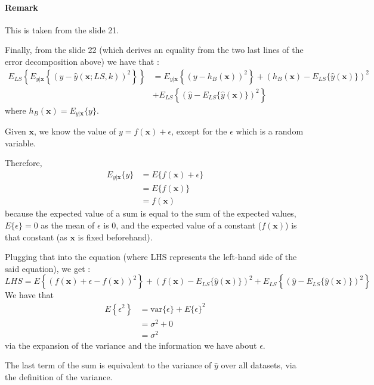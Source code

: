 \paragraph{Remark} This is taken from the slide 21.\par
Finally, from the slide 22 (which derives an equality from the two last lines of the error decomposition above) we have that :
\begin{align*}
    E_{L S}\left\{E_{y | \mathbf{x}}\left\{(y-\hat{y}(\mathbf{x} ; L S, k))^{2}\right\}\right\} &= E_{y | \mathbf{x}}\left\{\left(y-h_{B}(\mathbf{x})\right)^{2}\right\} + \left(h_{B}(\mathbf{x})-E_{L S}\{\hat{y}(\mathbf{x})\}\right)^{2}\\
    &+ E_{L S}\left\{\left(\hat{y}-E_{L S}\{\hat{y}(\mathbf{x})\}\right)^{2}\right\}    
\end{align*}
where $h_{B}(\mathbf{x})=E_{y | \mathbf{x}}\{y\}$.\par
Given $\mathbf{x}$, we know the value of $y = f(\mathbf{x}) + \epsilon$, except for the $\epsilon$ which is a random variable.\par
Therefore,
\begin{align*}
    E_{y | \mathbf{x}}\{y\} &= E\{f(\mathbf{x}) + \epsilon\}\\
    &= E\{f(\mathbf{x})\}\\
    &= f(\mathbf{x})
\end{align*}
because the expected value of a sum is equal to the sum of the expected values, $E\{\epsilon\} = 0$ as the mean of $\epsilon$ is $0$, and the expected value of a constant ($f(\mathbf{x})$) is that constant (as $\mathbf{x}$ is fixed beforehand).\par
Plugging that into the equation (where LHS represents the left-hand side of the said equation), we get :
$$
LHS = E\left\{\left(f(\mathbf{x}) + \epsilon-f(\mathbf{x})\right)^{2}\right\} + \left(f(\mathbf{x})-E_{L S}\{\hat{y}(\mathbf{x})\}\right)^{2} + E_{L S}\left\{\left(\hat{y}-E_{L S}\{\hat{y}(\mathbf{x})\}\right)^{2}\right\}    
$$
We have that
\begin{align*}
    E\left\{\epsilon^{2}\right\} &= \text{var}\{\epsilon\} + E\{\epsilon\}^2\\
    &= \sigma^2 + 0\\
    &= \sigma^2
\end{align*}
via the expansion of the variance and the information we have about $\epsilon$.\par
The last term of the sum is equivalent to the variance of $\hat{y}$ over all datasets, via the definition of the variance.\par
